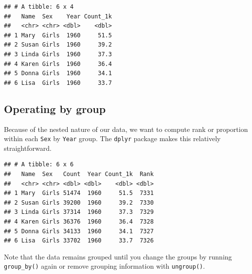 \documentclass[]{book}
\newenvironment{Shaded}{\begin{snugshade}}{\end{snugshade}}
\newcommand{\DataTypeTok}[1]{\textcolor[rgb]{0.13,0.29,0.53}{#1}}
\newcommand{\KeywordTok}[1]{\textcolor[rgb]{0.13,0.29,0.53}{\textbf{#1}}}
\newcommand{\NormalTok}[1]{#1}
\newcommand{\OperatorTok}[1]{\textcolor[rgb]{0.81,0.36,0.00}{\textbf{#1}}}
\newcommand{\StringTok}[1]{\textcolor[rgb]{0.31,0.60,0.02}{#1}}
\begin{document}
\begin{verbatim}
## # A tibble: 6 x 4
##   Name  Sex    Year Count_1k
##   <chr> <chr> <dbl>    <dbl>
## 1 Mary  Girls  1960     51.5
## 2 Susan Girls  1960     39.2
## 3 Linda Girls  1960     37.3
## 4 Karen Girls  1960     36.4
## 5 Donna Girls  1960     34.1
## 6 Lisa  Girls  1960     33.7
\end{verbatim}

\hypertarget{operating-by-group}{%
\subsection{Operating by group}\label{operating-by-group}}

Because of the nested nature of our data, we want to compute rank
or proportion within each \texttt{Sex} by \texttt{Year} group. The \texttt{dplyr}
package makes this relatively straightforward.

\begin{Shaded}
\end{Shaded}

\begin{verbatim}
## # A tibble: 6 x 6
##   Name  Sex   Count  Year Count_1k  Rank
##   <chr> <chr> <dbl> <dbl>    <dbl> <dbl>
## 1 Mary  Girls 51474  1960     51.5  7331
## 2 Susan Girls 39200  1960     39.2  7330
## 3 Linda Girls 37314  1960     37.3  7329
## 4 Karen Girls 36376  1960     36.4  7328
## 5 Donna Girls 34133  1960     34.1  7327
## 6 Lisa  Girls 33702  1960     33.7  7326
\end{verbatim}

Note that the data remains grouped until you change the groups by
running \texttt{group\_by()} again or remove grouping information with
\texttt{ungroup()}.
\end{document}
